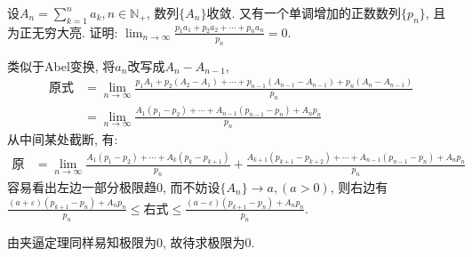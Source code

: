      \begin{exercise}
         设$A_n=\sum_{k=1}^{n}a_k, n\in \mathbb{N}_+$, 数列$\{A_n\}$收敛. 又有一个单调增加的正数数列$\{p_n\}$, 且为正无穷大亮. 证明: $\lim_{n\to\infty}\frac{p_1a_1+p_2a_2+\cdots+p_na_n}{p_n}=0$.
     \end{exercise}
     \begin{solution}
         类似于Abel变换, 将$a_n$改写成$A_n-A_{n-1}$,
         \begin{align*}
             \text{原式}
              & = \lim_{n\to\infty}\frac{p_1A_1+p_2(A_2-A_1)+\cdots+p_{n-1}(A_{n-1}-A_{n-1})+p_n(A_n-A_{n-1})}{p_n} \\
              & = \lim_{n\to\infty}\frac{A_1(p_1-p_2)+\cdots+A_{n-1}(p_{n-1}-p_n)+A_np_n}{p_n}
         \end{align*}
         从中间某处截断, 有:
         \begin{align*}
             \text{原式}
              & = \lim_{n\to\infty}\frac{A_1(p_1-p_2)+\cdots+A_k(p_k-p_{k+1})}{p_n}+\frac{A_{k+1}(p_{k+1}-p_{k+2})+\cdots+A_{n-1}(p_{n-1}-p_n)+A_np_n}{p_n}
         \end{align*}
         容易看出左边一部分极限趋0, 而不妨设$\{A_n\}\to a,(a>0)$, 则右边有$\frac{(a+\varepsilon)(p_{k+1}-p_n)+A_np_n}{p_n}\leqslant \text{右式}\leqslant \frac{(a-\varepsilon)(p_{k+1}-p_n)+A_np_n}{p_n}$.

         由夹逼定理同样易知极限为0, 故待求极限为0.
     \end{solution}

